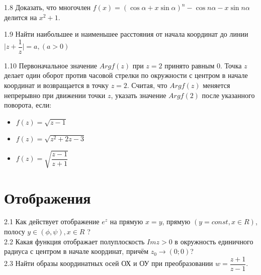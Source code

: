\documentclass{article}
\begin{document}
1.8 Доказать, что многочлен $f(x) = (\cos \alpha + x \sin \alpha)^n - \cos n\alpha - x\sin n\alpha$ делится на $x^2+1$.

1.9 Найти наибольшее и наименьшее расстояния от начала координат до линии $\vert z + \dfrac{1}{z}\vert = a, (a>0)$

1.10 Первоначальное значение $Arg f(z)$ при $z=2$ принято равным 0. Точка $z$ делает один оборот против часовой стрелки по окружности с центром в начале координат и возвращается в точку $z=2$. Считая, что  $Arg f(z)$ меняется непрерывно при движении точки $z$, указать значение $Arg f(2)$ после указанного поворота, если: \begin{itemize}
	\item $f(z) = \sqrt{z-1}$
	\item $f(z) = \sqrt{z^2+2z-3}$
	\item $f(z) = \sqrt{\dfrac{z-1}{z+1}}$
\end{itemize}

    
\section{Отображения}
2.1 Как действует отображение $e^z$ на прямую $x=y$, прямую $(y=const, x\in R)$, полосу $y\in(\phi, \psi), x\in R$ ?\\
2.2 Какая функция отображает полуплоскость $Im z > 0$ в окружность единичного радиуса с центром в начале координат, причём $z_0 \rightarrow (0; 0)$? \\
2.3 Найти образы координатных осей ОХ и ОУ при преобразовании $w= \dfrac{z+1}{z-1}$.
\end{document}
